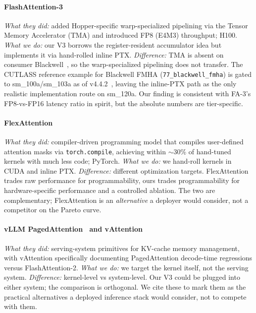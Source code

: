 \documentclass[conference]{IEEEtran}
\begin{document}
\paragraph*{FlashAttention-3~\cite{shah2024flashattention3}}
\emph{What they did:} added Hopper-specific warp-specialized
pipelining via the Tensor Memory Accelerator (TMA) and introduced
FP8 (E4M3) throughput; H100. \emph{What we do:} our V3 borrows the
register-resident accumulator idea but implements it via hand-rolled
inline PTX. \emph{Difference:} TMA is absent on consumer
Blackwell~\cite{nvidia2025blackwell}, so the warp-specialized
pipelining does not transfer. The CUTLASS reference example for
Blackwell FMHA (\texttt{77\_blackwell\_fmha}) is gated to
sm\_100a/sm\_103a as of v4.4.2~\cite{nvidia2024cutlass}, leaving the
inline-PTX path as the only realistic implementation route on
sm\_120a. Our finding is consistent with FA-3's FP8-vs-FP16 latency
ratio in spirit, but the absolute numbers are tier-specific.

\paragraph*{FlexAttention~\cite{dong2025flexattention}}
\emph{What they did:} compiler-driven programming model that compiles
user-defined attention masks via \texttt{torch.compile}, achieving
within $\sim$30\% of hand-tuned kernels with much less code; PyTorch.
\emph{What we do:} we hand-roll kernels in CUDA and inline PTX.
\emph{Difference:} different optimization targets. FlexAttention
trades raw performance for programmability, ours trades
programmability for hardware-specific performance and a controlled
ablation. The two are complementary; FlexAttention is an
\emph{alternative} a deployer would consider, not a competitor on
the Pareto curve.

\paragraph*{vLLM PagedAttention~\cite{kwon2023vllm} and
vAttention~\cite{prabhu2024vattention}}
\emph{What they did:} serving-system primitives for KV-cache memory
management, with vAttention specifically documenting PagedAttention
decode-time regressions versus FlashAttention-2.
\emph{What we do:} we target the kernel itself, not the serving
system. \emph{Difference:} kernel-level vs system-level. Our V3 could
be plugged into either system; the comparison is orthogonal. We cite
these to mark them as the practical alternatives a deployed
inference stack would consider, not to compete with them.
\end{document}
